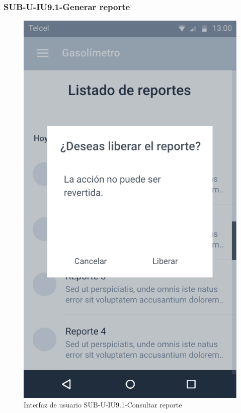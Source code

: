 \subsubsection{SUB-U-IU9.1-Generar reporte}\label{SUB-U-IU9.1}
\begin{figure}[H]
	\centering
	\includegraphics[scale=1]{Capitulo4/software/submodulos/usuarios/images/sub-u-iu9_1}
	\caption{Interfaz de usuario SUB-U-IU9.1-Consultar reporte}
	\label{fig:sub-u-iu9.1}
\end{figure}